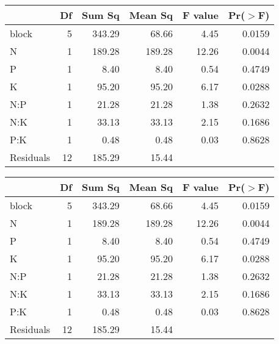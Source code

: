 \documentclass{article}
\begin{document}
\begin{table}[ht]
\begin{center}
\begin{tabular}{lrrrrr}
\hline
 & Df & Sum Sq & Mean Sq & F value & Pr($>$F) \\
\hline
block & 5 & 343.29 & 68.66 & 4.45 & 0.0159 \\
N & 1 & 189.28 & 189.28 & 12.26 & 0.0044 \\
P & 1 & 8.40 & 8.40 & 0.54 & 0.4749 \\
K & 1 & 95.20 & 95.20 & 6.17 & 0.0288 \\
N:P & 1 & 21.28 & 21.28 & 1.38 & 0.2632 \\
N:K & 1 & 33.13 & 33.13 & 2.15 & 0.1686 \\
P:K & 1 & 0.48 & 0.48 & 0.03 & 0.8628 \\
Residuals & 12 & 185.29 & 15.44 &  &  \\
\hline
\end{tabular}
\end{center}
\end{table}
\begin{table}[ht]
\begin{center}
\begin{tabular}{lrrrrr}
\hline
 & Df & Sum Sq & Mean Sq & F value & Pr($>$F) \\
\hline
block       & 5 & 343.29 & 68.66 & 4.45 & 0.0159 \\
N           & 1 & 189.28 & 189.28 & 12.26 & 0.0044 \\
P           & 1 & 8.40 & 8.40 & 0.54 & 0.4749 \\
K           & 1 & 95.20 & 95.20 & 6.17 & 0.0288 \\
N:P         & 1 & 21.28 & 21.28 & 1.38 & 0.2632 \\
N:K         & 1 & 33.13 & 33.13 & 2.15 & 0.1686 \\
P:K         & 1 & 0.48 & 0.48 & 0.03 & 0.8628 \\
Residuals   & 12 & 185.29 & 15.44 &  &  \\
\hline
\end{tabular}
\end{center}
\end{table}
\end{document}

